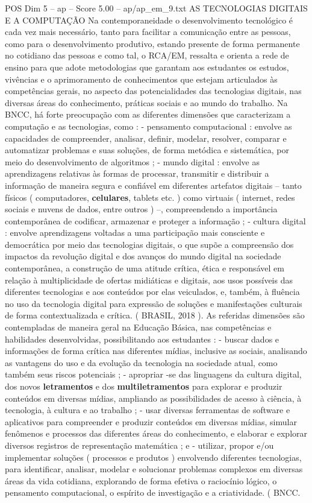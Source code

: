 \begin{textsample}{POS Dim 5 – ap – Score 5.00 – ap/ap\_em\_9.txt}  \label{ex:f5_pos_167}
AS TECNOLOGIAS DIGITAIS E A COMPUTAÇÃO Na contemporaneidade o desenvolvimento tecnológico é cada vez mais necessário, tanto para facilitar a comunicação entre as pessoas, como para o desenvolvimento produtivo, estando presente de forma permanente no cotidiano das pessoas e como tal, o RCA/EM, ressalta e orienta a rede de ensino para que adote metodologias que garantam aos estudantes os estudos, vivências e o aprimoramento de conhecimentos que estejam articulados às competências gerais, no aspecto das potencialidades das tecnologias digitais, nas diversas áreas do conhecimento, práticas sociais e ao mundo do trabalho.
Na BNCC, há forte preocupação com as diferentes dimensões que caracterizam a computação e as tecnologias, como : - pensamento computacional : envolve as capacidades de compreender, analisar, definir, modelar, resolver, comparar e automatizar problemas e suas soluções, de forma metódica e sistemática, por meio do desenvolvimento de algoritmos ; - mundo digital : envolve as aprendizagens relativas às formas de processar, transmitir e distribuir a informação de maneira segura e confiável em diferentes artefatos digitais – tanto físicos ( computadores, \textbf{celulares}, tablets etc. ) como virtuais ( internet, redes sociais e nuvens de dados, entre outros ) –, compreendendo a importância contemporânea de codificar, armazenar e proteger a informação ; - cultura digital : envolve aprendizagens voltadas a uma participação mais consciente e democrática por meio das tecnologias digitais, o que supõe a compreensão dos impactos da revolução digital e dos avanços do mundo digital na sociedade contemporânea, a construção de uma atitude crítica, ética e responsável em relação à multiplicidade de ofertas midiáticas e digitais, aos usos possíveis das diferentes tecnologias e aos conteúdos por elas veiculados, e, também, à fluência no uso da tecnologia digital para expressão de soluções e manifestações culturais de forma contextualizada e crítica. ( BRASIL, 2018 ).
As referidas dimensões são contempladas de maneira geral na Educação Básica, nas competências e habilidades desenvolvidas, possibilitando aos estudantes : - buscar dados e informações de forma crítica nas diferentes mídias, inclusive as sociais, analisando as vantagens do uso e da evolução da tecnologia na sociedade atual, como também seus riscos potenciais ; - apropriar -se das linguagens da cultura digital, dos novos \textbf{letramentos} e dos \textbf{multiletramentos} para explorar e produzir conteúdos em diversas mídias, ampliando as possibilidades de acesso à ciência, à tecnologia, à cultura e ao trabalho ; - usar diversas ferramentas de software e aplicativos para compreender e produzir conteúdos em diversas mídias, simular fenômenos e processos das diferentes áreas do conhecimento, e elaborar e explorar diversos registros de representação matemática ; e - utilizar, propor e/ou implementar soluções ( processos e produtos ) envolvendo diferentes tecnologias, para identificar, analisar, modelar e solucionar problemas complexos em diversas áreas da vida cotidiana, explorando de forma efetiva o raciocínio lógico, o pensamento computacional, o espírito de investigação e a criatividade. ( BNCC.

\end{textsample}
